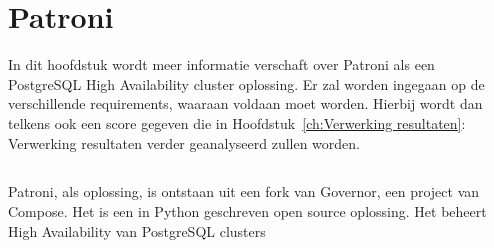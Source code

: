 \chapter{Patroni}
\label{ch:Patroni}

In dit hoofdstuk wordt meer informatie verschaft over Patroni als een PostgreSQL High Availability cluster oplossing. Er zal worden ingegaan op de verschillende requirements, waaraan voldaan moet worden. Hierbij wordt dan telkens ook een score gegeven die in Hoofdstuk~\ref{ch:Verwerking resultaten}: Verwerking resultaten verder geanalyseerd zullen worden.

\section{}
\label{sec:Inleiding tot Patroni}

Patroni, als oplossing, is ontstaan uit een fork van Governor, een project van Compose. Het is een in Python geschreven open source oplossing. Het beheert High Availability van PostgreSQL clusters

\section{}
\label{sec:Requirements}

\subsection{}
\label{subsec:Must have}

\subsubsection{}
\label{subsubsec:Replicatie}

